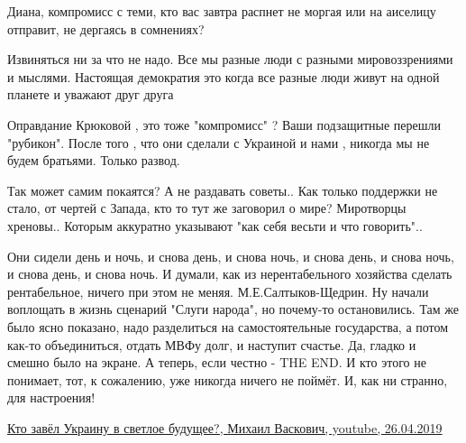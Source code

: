 
Диана, компромисс с теми, кто вас завтра распнет не моргая или на аиселицу
отправит, не дергаясь в сомнениях?

 
Извиняться ни за что не надо. Все мы разные люди с разными мировоззрениями и
мыслями. Настоящая демократия это когда все разные люди живут на одной планете
и уважают друг друга


Оправдание Крюковой , это тоже "компромисс" ? Ваши подзащитные перешли
"рубикон". После того , что они сделали с Украиной и нами , никогда мы не будем
братьями. Только развод.


Так может самим покаятся? А не раздавать советы.. Как только поддержки не
стало, от чертей с Запада, кто то тут же заговорил о мире? Миротворцы хреновы..
Которым аккуратно указывают "как себя весьти и что говорить"..


Они сидели день и ночь, и снова день, и снова ночь, и снова день, и снова ночь,
и снова день, и снова ночь. И думали, как из нерентабельного хозяйства сделать
рентабельное, ничего при этом не меняя. М.Е.Салтыков-Щедрин. Ну начали
воплощать в жизнь сценарий "Слуги народа", но почему-то остановились. Там же
было ясно показано, надо разделиться на самостоятельные государства, а потом
как-то объединиться, отдать МВФу долг, и наступит счастье. Да, гладко и смешно
было на экране. А теперь, если честно - THE END. И кто этого не понимает, тот,
к сожалению, уже никогда ничего не поймёт. И, как ни странно, для настроения!

\href{https://www.youtube.com/watch?v=O8J_IxYmtfo}{%
Кто завёл Украину в светлое будущее?, %
Михаил Васкович, youtube, 26.04.2019%
}

 
